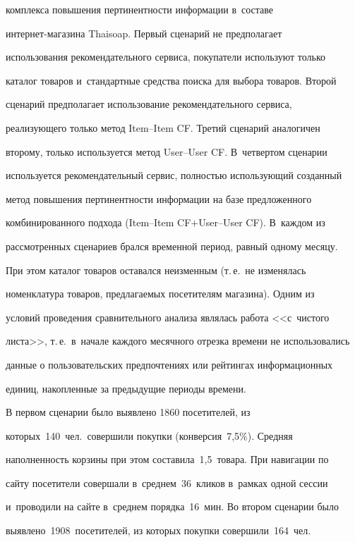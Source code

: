 комплекса повышения пертинентности информации в~составе  


ин\-тер\-нет-ма\-га\-зи\-на Thaisoap. Первый сценарий не предполагает 


использования рекомендательного сервиса, покупатели используют только 


каталог товаров и~стандартные средства поиска для выбора товаров. Второй 


сценарий предполагает использование рекомендательного сервиса, 


реализующего только метод Item--Item CF. Третий сценарий аналогичен 


второму, только используется метод User--User CF. В~четвертом сценарии 


используется рекомендательный сервис, полностью использующий созданный 


метод повышения пертинентности информации на базе предложенного 


комбинированного подхода (Item--Item CF\;+\;User--User CF). В~каждом из 


рассмотренных сценариев брался временной период, равный одному месяцу. 


При этом каталог товаров оставался неизменным (т.\,е.\ не изменялась 


номенклатура товаров, предлагаемых посетителям магазина). Одним из 


условий проведения сравнительного анализа являлась работа <<с~чистого 


листа>>, т.\,е.\ в~начале каждого месячного отрезка времени не использовались 


данные о пользовательских предпочтениях или рейтингах информационных 


единиц, накопленные за предыдущие периоды времени.


  


  В первом сценарии было выявлено 1860 посетителей, из 


которых~140~чел.\ совершили покупки (конверсия~7,5\%). Средняя 


наполненность корзины при этом составила~1,5~товара. При навигации по 


сайту посетители совершали в~сред\-нем~36~кликов в~рамках одной сессии 


и~проводили на сайте в~среднем порядка~16~мин. Во втором сценарии было 


выявлено~1908~посетителей, из ко\-то\-рых покупки совершили~164~чел.\ 


